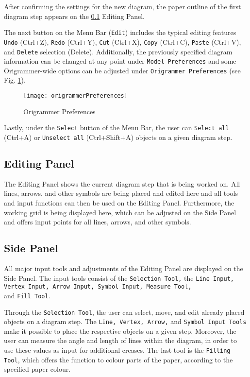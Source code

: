 After confirming the settings for the new diagram, the paper outline of the first diagram step appears on the \ref{sec:editingPanel} Editing Panel.

The next button on the Menu Bar (\texttt{Edit}) includes the typical editing features \texttt{Undo} (Ctrl+Z), \texttt{Redo} (Ctrl+Y), \texttt{Cut} (Ctrl+X), \texttt{Copy} (Ctrl+C), \texttt{Paste} (Ctrl+V), and \texttt{Delete} selection (Delete). Additionally, the previously specified diagram information can be changed at any point under \texttt{Model Preferences} and some Origrammer-wide options can be adjusted under \texttt{Origrammer Preferences} (see Fig. \ref{fig:origrammerPreferences}).

\begin{figure}[h]
	\centering
	\texttt{[image: origrammerPreferences]}
	\caption{Origrammer Preferences}
	\label{fig:origrammerPreferences}
\end{figure}

\noindent Lastly, under the \texttt{Select} button of the Menu Bar, the user can \texttt{Select all} (Ctrl+A) or \texttt{Unselect all} (Ctrl+Shift+A) objects on a given diagram step.

\subsection{Editing Panel}
\label{sec:editingPanel}

The Editing Panel shows the current diagram step that is being worked on. All lines, arrows, and other symbols are being placed and edited here and all tools and input functions can then be used on the Editing Panel. Furthermore, the working grid is being displayed here, which can be adjusted on the Side Panel and offers input points for all lines, arrows, and other symbols.

\subsection{Side Panel}
\label{sec:sidePanel}

All major input tools and adjustments of the Editing Panel are displayed on the Side Panel. The input tools consist of the \texttt{Selection Tool,} the \texttt{Line Input, Vertex Input, Arrow Input, Symbol Input, Measure Tool,}\\ and \texttt{Fill Tool}.

Through the \texttt{Selection Tool}, the user can select, move, and edit already placed objects on a diagram step. The \texttt{Line, Vertex, Arrow,} and \texttt{Symbol Input Tools} make it possible to place the respective objects on a given step. Moreover, the user can measure the angle and length of lines within the diagram, in order to use these values as input for additional creases. The last tool is the \texttt{Filling Tool}, which offers the function to colour parts of the paper, according to the specified paper colour.


